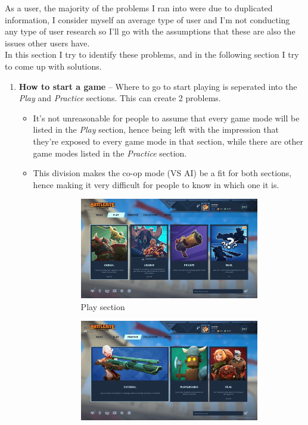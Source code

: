 \documentclass[a4paper,12pt]{article}
\begin{document}
As a user, the majority of the problems I ran into were due to duplicated information, I consider myself an average type of user and I'm not conducting any type of user research so I'll go with the assumptions that these are also the issues other users have.\\
In this section I try to identify these problems, and in the following section I try to come up with solutions.
\begin{enumerate}[label=\textbf{\arabic*})]
    \item \textbf{How to start a game} -- Where to go to start playing is seperated into the \textit{Play} and \textit{Practice} sections. This can create 2 problems. \begin{itemize}
        \item It's not unreasonable for people to assume that every game mode will be listed in the \textit{Play} section, hence being left with the impression that they're exposed to every game mode in that section, while there are other game modes listed in the \textit{Practice} section.
        \item This division makes the co-op mode (VS AI) be a fit for both sections, hence making it very difficult for people to know in which one it is.
        \begin{figure}[h!]
            \centering
            \begin{subfigure}[b]{0.45\linewidth}
                \includegraphics[width=\linewidth]{res/current/play.png}
                \caption{Play section}
            \end{subfigure}
            \begin{subfigure}[b]{0.45\linewidth}
                \includegraphics[width=\linewidth]{res/current/practice.png}

\end{subfigure}
\end{figure}
\end{itemize}
\end{enumerate}
\end{document}
